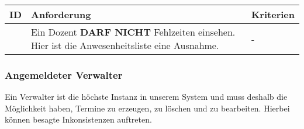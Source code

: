 \begin{tabular} {|p{}|p{}|p{}|}
	\hline
	ID & Anforderung & Kriterien \\
	\hline
	\printfreqnr
	& Ein Dozent \textbf{DARF NICHT} Fehlzeiten einsehen. Hier ist die Anwesenheitsliste eine Ausnahme. 
	& - \\
	\hline
\end{tabular}

\newpage

\subsubsection{Angemeldeter Verwalter}
Ein Verwalter ist die höchste Instanz in unserem System und muss deshalb die Möglichkeit haben, Termine zu erzeugen, zu löschen und zu bearbeiten. Hierbei können besagte Inkonsistenzen auftreten.

\vspace{12pt}

